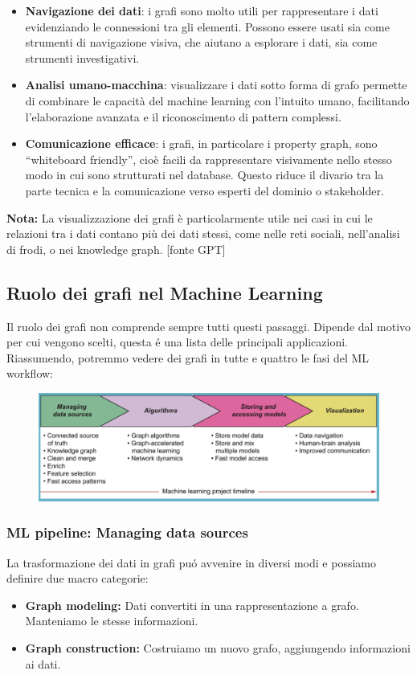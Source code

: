 \begin{itemize}
    \item \textbf{Navigazione dei dati}: i grafi sono molto utili per rappresentare i dati evidenziando le connessioni tra gli elementi. Possono essere usati sia come strumenti di navigazione visiva, che aiutano a esplorare i dati, sia come strumenti investigativi.
    
    \item \textbf{Analisi umano-macchina}: visualizzare i dati sotto forma di grafo permette di combinare le capacità del machine learning 
    con l’intuito umano, facilitando l’elaborazione avanzata e il riconoscimento di pattern complessi.
    
    \item \textbf{Comunicazione efficace}: i grafi, in particolare i property graph, sono “whiteboard friendly”, cioè facili da rappresentare 
    visivamente nello stesso modo in cui sono strutturati nel database. Questo riduce il divario tra la parte tecnica e la comunicazione verso esperti del dominio o stakeholder.
\end{itemize}
\textbf{Nota:} La visualizzazione dei grafi è particolarmente utile nei casi in cui le relazioni tra i dati contano più dei dati stessi, come nelle reti sociali, nell’analisi di frodi, o nei knowledge graph. [fonte GPT]

\subsection{Ruolo dei grafi nel Machine Learning}
Il ruolo dei grafi non comprende sempre tutti questi passaggi. Dipende dal motivo per cui vengono scelti, questa é una lista delle principali applicazioni. Riassumendo, potremmo vedere dei grafi in tutte e quattro le fasi del ML workflow:
\\
\begin{figure}[th]
    \centering
    \includegraphics[width=0.75\linewidth]{ML&Graphs//img/worflow.png}
\end{figure}

\subsubsection*{ML pipeline: Managing data sources}
La trasformazione dei dati in grafi puó avvenire in diversi modi e possiamo definire due macro categorie:
\begin{itemize}
    \item \textbf{Graph modeling:} Dati convertiti in una rappresentazione a grafo. Manteniamo le stesse informazioni.
    \item \textbf{Graph construction:} Costruiamo un nuovo grafo, aggiungendo informazioni ai dati.
\end{itemize}
